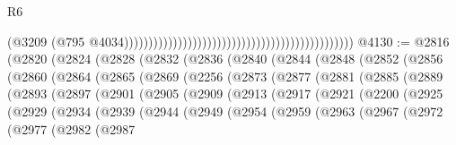\begin{lexlean}{R6}
\begin{coremodule}
                                                                                              (@3209
                                                                                                (@795
                                                                                                  @4034)))))))))))))))))))))))))))))))))))))))))))))))
@4130 := @2816
    (@2820
      (@2824
        (@2828
          (@2832
            (@2836
              (@2840
                (@2844
                  (@2848
                    (@2852
                      (@2856
                        (@2860
                          (@2864
                            (@2865
                              (@2869
                                (@2256
                                  (@2873
                                    (@2877
                                      (@2881
                                        (@2885
                                          (@2889
                                            (@2893
                                              (@2897
                                                (@2901
                                                  (@2905
                                                    (@2909
                                                      (@2913
                                                        (@2917
                                                          (@2921
                                                            (@2200
                                                              (@2925
                                                                (@2929
                                                                  (@2934
                                                                    (@2939
                                                                      (@2944
                                                                        (@2949
                                                                          (@2954
                                                                            (@2959
                                                                              (@2963
                                                                                (@2967
                                                                                  (@2972
                                                                                    (@2977
                                                                                      (@2982
                                                                                        (@2987

\end{coremodule}
\end{lexlean}
